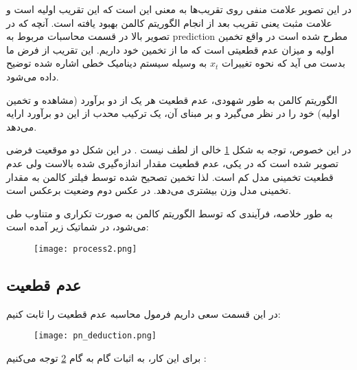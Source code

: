 \documentclass{scribe-cgenomics}
\begin{document}
در این تصویر 
\cite{intech}
علامت منفی روی تقریب‌ها به معنی این است که این تقریب اولیه است و علامت مثبت یعنی تقریب بعد از انجام الگوریتم کالمن بهبود یافته است.
آنچه که در تصویر بالا در قسمت محاسبات مربوط به prediction  مطرح شده است در واقع تخمین اولیه و میزان عدم قطعیتی است که ما از تخمین خود داریم. این تقریب از فرض ما بدست می آید که نحوه تغییرات
$x_t$
 به وسیله سیستم دینامیک خطی اشاره شده توضیح داده می‌شود.

الگوریتم کالمن به طور شهودی، عدم قطعیت هر یک از دو برآورد (مشاهده و تخمین اولیه) خود را در نظر می‌گیرد و بر مبنای آن، یک ترکیب محدب از این دو برآورد ارایه می‌دهد.

در این خصوص، توجه به شکل 
\ref{kalman_gain}
 خالی از لطف نیست
 \cite{kalman}. در این شکل دو موقعیت فرضی تصویر شده است که در یکی، عدم قطعیت مقدار اندازه‌گیری شده بالاست ولی عدم قطعیت تخمینی مدل کم است. لذا تخمین تصحیح شده توسط فیلتر کالمن به مقدار تخمینی مدل وزن بیشتری می‌دهد. در عکس دوم وضعیت برعکس است.

\begin{figure}
 
\label{kalman_gain}
\centering
\end{figure}

به طور خلاصه، فرآیندی که توسط الگوریتم کالمن به صورت تکراری و متناوب طی می‌شود، در شماتیک زیر آمده است:

\begin{figure}
\texttt{[image: process2.png]}
\centering
\end{figure}


\subsection{عدم قطعیت}
در این قسمت سعی داریم فرمول محاسبه عدم قطعیت را ثابت کنیم:
\begin{figure}
\texttt{[image: pn\_deduction.png]}
\centering
\end{figure}

برای این کار، به اثبات گام به گام 
\ref{uncertaity_proof}
 توجه می‌کنیم
\cite{kalman}:

\begin{figure}
\\
\label{uncertaity_proof}
\centering
\end{figure}
\end{document}
